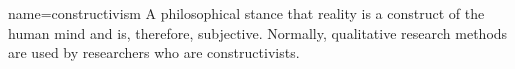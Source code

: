 






	{name={constructivism}}
	{%
	  A philosophical stance that reality is a construct of the human mind and is, therefore, subjective. Normally, qualitative research methods are used by researchers who are constructivists.
    }
